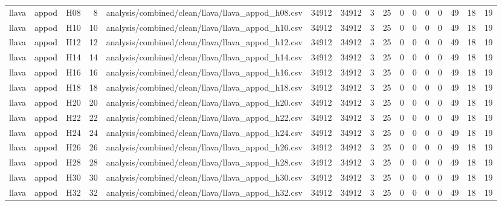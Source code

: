 \begin{longtable}{lllrlrrrrrrrrrrr}
llava & appod & H08 & 8 & analysis/combined/clean/llava/llava\_appod\_h08.csv & 34912 & 34912 & 3 & 25 & 0 & 0 & 0 & 0 & 49 & 18 & 19 \\
llava & appod & H10 & 10 & analysis/combined/clean/llava/llava\_appod\_h10.csv & 34912 & 34912 & 3 & 25 & 0 & 0 & 0 & 0 & 49 & 18 & 19 \\
llava & appod & H12 & 12 & analysis/combined/clean/llava/llava\_appod\_h12.csv & 34912 & 34912 & 3 & 25 & 0 & 0 & 0 & 0 & 49 & 18 & 19 \\
llava & appod & H14 & 14 & analysis/combined/clean/llava/llava\_appod\_h14.csv & 34912 & 34912 & 3 & 25 & 0 & 0 & 0 & 0 & 49 & 18 & 19 \\
llava & appod & H16 & 16 & analysis/combined/clean/llava/llava\_appod\_h16.csv & 34912 & 34912 & 3 & 25 & 0 & 0 & 0 & 0 & 49 & 18 & 19 \\
llava & appod & H18 & 18 & analysis/combined/clean/llava/llava\_appod\_h18.csv & 34912 & 34912 & 3 & 25 & 0 & 0 & 0 & 0 & 49 & 18 & 19 \\
llava & appod & H20 & 20 & analysis/combined/clean/llava/llava\_appod\_h20.csv & 34912 & 34912 & 3 & 25 & 0 & 0 & 0 & 0 & 49 & 18 & 19 \\
llava & appod & H22 & 22 & analysis/combined/clean/llava/llava\_appod\_h22.csv & 34912 & 34912 & 3 & 25 & 0 & 0 & 0 & 0 & 49 & 18 & 19 \\
llava & appod & H24 & 24 & analysis/combined/clean/llava/llava\_appod\_h24.csv & 34912 & 34912 & 3 & 25 & 0 & 0 & 0 & 0 & 49 & 18 & 19 \\
llava & appod & H26 & 26 & analysis/combined/clean/llava/llava\_appod\_h26.csv & 34912 & 34912 & 3 & 25 & 0 & 0 & 0 & 0 & 49 & 18 & 19 \\
llava & appod & H28 & 28 & analysis/combined/clean/llava/llava\_appod\_h28.csv & 34912 & 34912 & 3 & 25 & 0 & 0 & 0 & 0 & 49 & 18 & 19 \\
llava & appod & H30 & 30 & analysis/combined/clean/llava/llava\_appod\_h30.csv & 34912 & 34912 & 3 & 25 & 0 & 0 & 0 & 0 & 49 & 18 & 19 \\
llava & appod & H32 & 32 & analysis/combined/clean/llava/llava\_appod\_h32.csv & 34912 & 34912 & 3 & 25 & 0 & 0 & 0 & 0 & 49 & 18 & 19 \\
\end{longtable}
